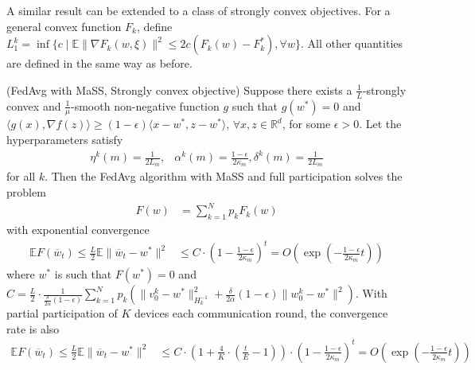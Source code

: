 A similar result can be extended to a class of strongly convex objectives.
For a general convex function $F_{k}$, define $L_{1}^{k}=\inf\{c\mid\mathbb{E}\|\nabla F_{k}(w,\xi)\|^{2}\leq2c(F_{k}(w)-F_{k}^{\ast}),\forall w\}$.
All other quantities are defined in the same way as before. 
\begin{thm}
	(FedAvg with MaSS, Strongly convex objective) Suppose there exists
	a $\frac{1}{L}$-strongly convex and $\frac{1}{\mu}$-smooth non-negative
	function $g$ such that $g(w^{\ast})=0$ and $\langle g(x),\nabla f(z)\rangle\geq(1-\epsilon)\langle x-w^{\ast},z-w^{\ast}\rangle$,
	$\forall x,z\in\mathbb{R}^{d}$, for some $\epsilon>0$. Let the hyperparameters
	satisfy 
	\begin{align*}
	\eta^{k}(m)=\frac{1}{2L_{m}}, & \alpha^{k}(m)=\frac{1-\epsilon}{2\kappa_{m}},\delta^{k}(m)=\frac{1}{2L_{m}}
	\end{align*}
	for all $k$. Then the FedAvg algorithm with MaSS and full participation
	solves the problem 
	\begin{align*}
	F(w) & =\sum_{k=1}^{N}p_{k}F_{k}(w)
	\end{align*}
	with exponential convergence
	\begin{align*}
	\mathbb{E}F(\overline{w}_{t})\leq\frac{L}{2}\mathbb{E}\|\overline{w}_{t}-w^{\ast}\|^{2} & \leq C\cdot(1-\frac{1-\epsilon}{2\kappa_{m}})^{t}=O(\exp(-\frac{1-\epsilon}{2\kappa_{m}}t))
	\end{align*}
	where $w^{\ast}$ is such that $F(w^{\ast})=0$ and $C=\frac{L}{2}\cdot\frac{1}{\frac{\delta}{2\alpha}(1-\epsilon)}\sum_{k=1}^{N}p_{k}(\|v_{0}^{k}-w^{\ast}\|_{H_{k}^{-1}}^{2}+\frac{\delta}{2\alpha}(1-\epsilon)\|w_{0}^{k}-w^{\ast}\|^{2})$.
	With partial participation of $K$ devices each communication round,
	the convergence rate is also 
	\begin{align*}
	\mathbb{E}F(\overline{w}_{t})\leq\frac{L}{2}\mathbb{E}\|\overline{w}_{t}-w^{\ast}\|^{2} & \leq C\cdot(1+\frac{4}{K}\cdot(\frac{t}{E}-1))\cdot(1-\frac{1-\epsilon}{2\kappa_{m}})^{t}=O(\exp(-\frac{1-\epsilon}{2\kappa_{m}}t))
	\end{align*}
\end{thm}